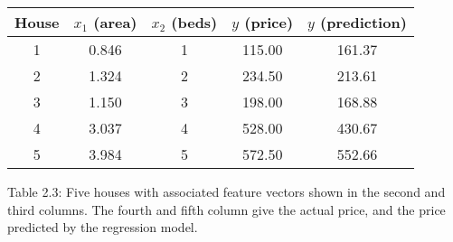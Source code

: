 \begin{table}
\begin{tabular}{c c c c c} \hline \hline House & \(x_{1}\) (area) & \(x_{2}\) (beds) & \(y\) (price) & \(\hat{y}\) (prediction) \\ \hline
1 & 0.846 & 1 & 115.00 & 161.37 \\
2 & 1.324 & 2 & 234.50 & 213.61 \\
3 & 1.150 & 3 & 198.00 & 168.88 \\
4 & 3.037 & 4 & 528.00 & 430.67 \\
5 & 3.984 & 5 & 572.50 & 552.66 \\ \hline \hline \end{tabular}
\end{table}
Table 2.3: Five houses with associated feature vectors shown in the second and third columns. The fourth and fifth column give the actual price, and the price predicted by the regression model.

 